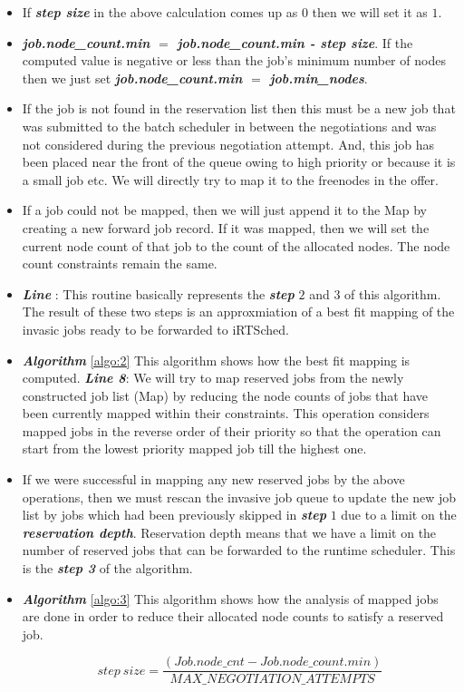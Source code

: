 \begin{itemize}
\item If \textbf{\textit{step size}} in the above calculation comes up as $0$ then we will set it as $1$.
\item \textbf{\textit{job.node\_count.min $=$ job.node\_count.min - step size}}. If the computed value is negative or less than the job's minimum number of nodes then we just set \textbf{\textit{job.node\_count.min $=$ job.min\_nodes}}.
\item If the job is not found in the reservation list then this must be a new job that was submitted to the batch scheduler in between the negotiations and was not considered during the previous negotiation attempt. And, this job has been placed near the front of the queue owing to high priority or because it is a small job etc. We will directly try to map it to the freenodes in the offer.
\item If a job could not be mapped, then we will just append it to the Map by creating a new forward job record. If it was mapped, then we will set the current node count of that job to the count of the allocated nodes. The node count constraints remain the same.
\item \textbf{\textit{Line }}: This routine basically represents the \textbf{\textit{step}} $2$ and $3$ of this algorithm. The result of these two steps is an approxmiation of a best fit mapping of the invasic jobs ready to be forwarded to iRTSched.
\item \textbf{\textit{Algorithm }}\ref{algo:2} This algorithm shows how the best fit mapping is computed. \textbf{\textit{Line 8}}: We will try to map reserved jobs from the newly constructed job list (Map) by reducing the node counts of jobs that have been currently mapped within their constraints. This operation considers mapped jobs in the reverse order of their priority so that the operation can start from the lowest priority mapped job till the highest one. 
\item If we were successful in mapping any new reserved jobs by the above operations, then we must rescan the invasive job queue to update the new job list by jobs which had been previously skipped in \textbf{\textit{step}} $1$ due to a limit on the \textbf{\textit{reservation depth}}. Reservation depth means that we have a limit on the number of reserved jobs that can be forwarded to the runtime scheduler. This is the \textbf{\textit{step 3}} of the algorithm.
\item \textbf{\textit{Algorithm }}\ref{algo:3} This algorithm shows how the analysis of mapped jobs are done in order to reduce their allocated node counts to satisfy a reserved job.
\vspace{-0.30in}
\begin{center}
\boldmath\begin{equation*}
step\ size = \frac{(Job.node\_cnt - Job.node\_count.min)}{MAX\_NEGOTIATION\_ATTEMPTS}
\end{equation*}
\end{center}
\end{itemize}
